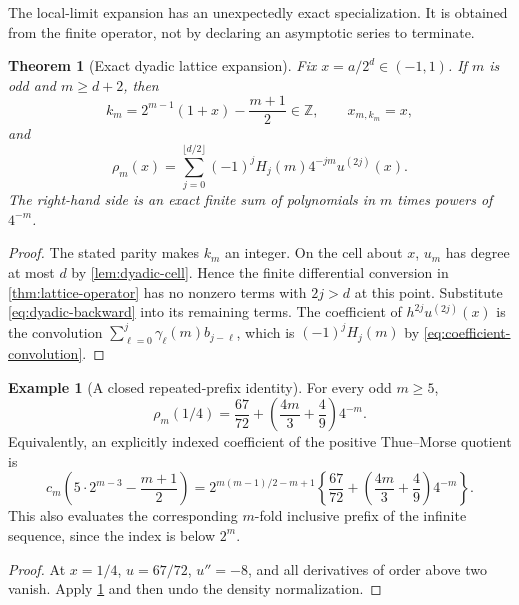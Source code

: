 \documentclass[11pt,a4paper]{article}
\numberwithin{equation}{section}
\newtheorem{theorem}{Theorem}[section]
\theoremstyle{definition}
\newtheorem{example}[example]{Example}
\newcommand{\Z}{\mathbb Z}
\begin{document}
The local-limit expansion has an unexpectedly exact specialization.
It is obtained from the finite operator, not by declaring an
asymptotic series to terminate.

\begin{theorem}[Exact dyadic lattice expansion]\label{thm:dyadic-lattice}
Fix $x=a/2^d\in(-1,1)$. If $m$ is odd and $m\geq d+2$, then
\begin{equation}
 k_m=2^{m-1}(1+x)-\frac{m+1}{2}\in\Z,
 \qquad x_{m,k_m}=x,
\end{equation}
and
\begin{equation}
 \boxed{\quad
 \rho_m(x)=\sum_{j=0}^{\lfloor d/2\rfloor}
                 (-1)^jH_j(m)4^{-jm}u^{(2j)}(x).
 \quad}
 \label{eq:exact-dyadic-lattice}
\end{equation}
The right-hand side is an exact finite sum of polynomials in $m$
times powers of $4^{-m}$.
\end{theorem}
\begin{proof}
The stated parity makes $k_m$ an integer. On the cell about $x$,
$u_m$ has degree at most $d$ by \cref{lem:dyadic-cell}. Hence the
finite differential conversion in \cref{thm:lattice-operator} has
no nonzero terms with $2j>d$ at this point. Substitute
\eqref{eq:dyadic-backward} into its remaining terms. The coefficient
of $h^{2j}u^{(2j)}(x)$ is the convolution
$\sum_{\ell=0}^j\gamma_\ell(m)b_{j-\ell}$, which is
$(-1)^jH_j(m)$ by \eqref{eq:coefficient-convolution}.
\end{proof}

\begin{example}[A closed repeated-prefix identity]\label{ex:quarter-lattice}
For every odd $m\geq5$,
\begin{equation}
 \rho_m(1/4)=\frac{67}{72}
       +\left(\frac{4m}{3}+\frac49\right)4^{-m}.
 \label{eq:quarter-lattice-exact}
\end{equation}
Equivalently, an explicitly indexed coefficient of the positive
Thue--Morse quotient is
\begin{equation}
 \boxed{\quad
 c_m\left(5\cdot2^{m-3}-\frac{m+1}{2}\right)
 =2^{m(m-1)/2-m+1}
  \left\{\frac{67}{72}+
         \left(\frac{4m}{3}+\frac49\right)4^{-m}\right\}.
 \quad}
 \label{eq:closed-prefix-quarter}
\end{equation}
This also evaluates the corresponding $m$-fold inclusive prefix
of the infinite sequence, since the index is below $2^m$.
\end{example}
\begin{proof}
At $x=1/4$, $u=67/72$, $u''=-8$, and all derivatives of order
above two vanish. Apply \cref{thm:dyadic-lattice} and then undo
the density normalization.
\end{proof}
\end{document}
